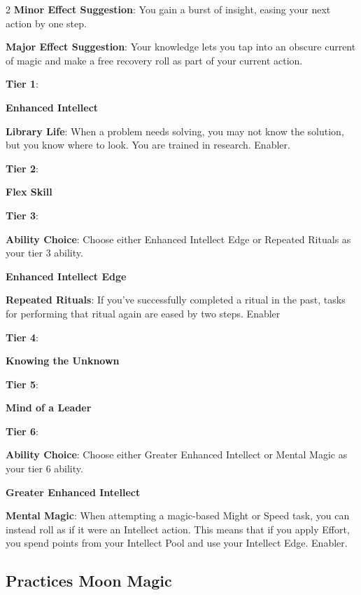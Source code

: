 \begin{multicols}{2}
\textbf{Minor Effect Suggestion}: You gain a burst of insight, easing your next action by one step.

\textbf{Major Effect Suggestion}: Your knowledge lets you tap into an obscure current of magic and make a free recovery roll as part of your current action.

\textbf{Tier 1}:

\textbf{Enhanced Intellect}
 
\textbf{Library Life}: When a problem needs solving, you may not know the solution, but you know where to look. You are trained in research. Enabler.

\textbf{Tier 2}:

\textbf{Flex Skill} 

\textbf{Tier 3}:

\textbf{Ability Choice}: Choose either Enhanced Intellect Edge or Repeated Rituals as your tier 3 ability.

\textbf{Enhanced Intellect Edge}

\textbf{Repeated Rituals}: If you’ve successfully completed a ritual in the past, tasks for performing that ritual again are eased by two steps. Enabler

\textbf{Tier 4}:

\textbf{Knowing the Unknown} 

\textbf{Tier 5}:

\textbf{Mind of a Leader}

\textbf{Tier 6}:

\textbf{Ability Choice}: Choose either Greater Enhanced Intellect or Mental Magic as your tier 6 ability.

\textbf{Greater Enhanced Intellect}
 
\textbf{Mental Magic}: When attempting a magic-based Might or Speed task, you can instead roll as if it were an Intellect action. This means that if you apply Effort, you spend points from your Intellect Pool and use your Intellect Edge. Enabler.

\subsection{Practices Moon Magic}  


\end{multicols}

